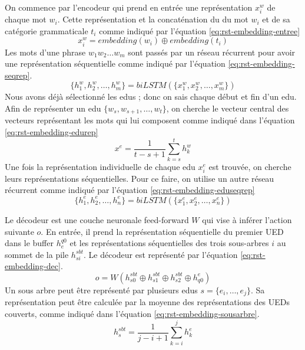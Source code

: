 \documentclass{KodeBook}
\begin{document}
On commence par l'encodeur qui prend en entrée une représentation $x_i^w$ de chaque mot $w_i$. 
Cette représentation et la concaténation du  du mot $w_i$ et de sa catégorie grammaticale $t_i$ comme indiqué par l'équation \ref{eq:rst-embedding-entree}
\begin{equation}\label{eq:rst-embedding-entree}
x_i^w = embedding(w_i) \oplus embedding(t_i)
\end{equation}
Les mots d'une phrase $w_1 w_2 \ldots w_m$ sont passés par un réseau récurrent  pour avoir une représentation séquentielle comme indiqué par l'équation \ref{eq:rst-embedding-seqrep}.
\begin{equation}\label{eq:rst-embedding-seqrep}
\{h_1^w, h_2^w, \ldots, h_m^w \} = biLSTM(\{x_1^w, x_2^w, \ldots, x_m^w \})
\end{equation}
Nous avons déjà sélectionné les \ac{edu}s ; donc on sais chaque début et fin d'un \ac{edu}. 
Afin de représenter un \ac{edu} $\{w_s, w_{s+1}, \ldots, w_t \}$, on cherche le vecteur central des vecteurs représentant les mots qui lui composent comme indiqué dans l'équation \ref{eq:rst-embedding-edurep}
\begin{equation}\label{eq:rst-embedding-edurep}
x^e = \frac{1}{t-s+1} \sum_{k=s}^{t} h_k^w
\end{equation}
Une fois la représentation individuelle de chaque \ac{edu} $x_i^e$ est trouvée, on cherche leurs représentations séquentielles. 
Pour ce faire, on utilise un autre réseau récurrent  comme indiqué par l'équation \ref{eq:rst-embedding-eduseqrep}
\begin{equation}\label{eq:rst-embedding-eduseqrep}
\{h_1^e, h_2^e, \ldots, h_n^e \} = biLSTM(\{x_1^e, x_2^e, \ldots, x_n^e \})
\end{equation}

Le décodeur est une couche neuronale feed-forward $W$ qui vise à inférer l'action suivante $o$. 
En entrée, il prend la représentation séquentielle du premier UED dans le buffer $ h_{e}^{q0} $ et les représentations séquentielles des trois sous-arbres $i$ au sommet de la pile $h_{si}^{sbt}$. 
Le décodeur est représenté par l'équation \ref{eq:rst-embedding-dec}. 
\begin{equation}\label{eq:rst-embedding-dec}
o = W(h_{s0}^{sbt} \oplus h_{s1}^{sbt} \oplus h_{s2}^{sbt} \oplus h_{q0}^{e})
\end{equation}
Un sous arbre peut être représenté par plusieurs \ac{edu}s $ s= \{e_i, \ldots, e_j\}$. 
Sa représentation peut être calculée par la moyenne des représentations des UEDs couverts, comme indiqué dans l'équation \ref{eq:rst-embedding-sousarbre}. 
\begin{equation}\label{eq:rst-embedding-sousarbre}
h_{s}^{sbt} = \frac{1}{j-i+1} \sum_{k=i}^{j} h_k^e
\end{equation}
\end{document}
